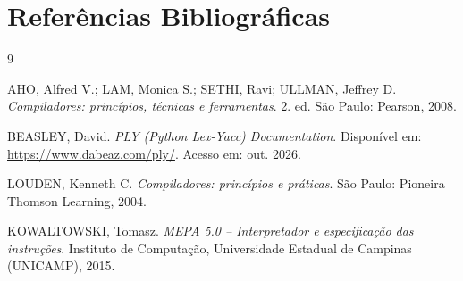 \documentclass[12pt,a4paper]{article}
\begin{document}
\section{Referências Bibliográficas}

\begin{thebibliography}{9}

AHO, Alfred V.; LAM, Monica S.; SETHI, Ravi; ULLMAN, Jeffrey D.
\textit{Compiladores: princípios, técnicas e ferramentas}.
2. ed. São Paulo: Pearson, 2008.

BEASLEY, David.
\textit{PLY (Python Lex-Yacc) Documentation}.
Disponível em: \url{https://www.dabeaz.com/ply/}. Acesso em: out. 2026.

LOUDEN, Kenneth C.
\textit{Compiladores: princípios e práticas}.
São Paulo: Pioneira Thomson Learning, 2004.

KOWALTOWSKI, Tomasz.
\textit{MEPA 5.0 -- Interpretador e especificação das instruções}.
Instituto de Computação, Universidade Estadual de Campinas (UNICAMP), 2015.

\end{thebibliography}
\end{document}
